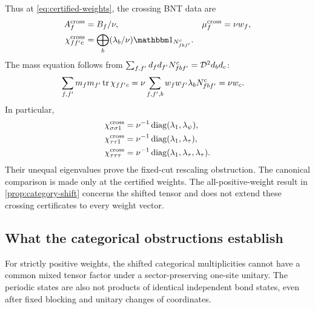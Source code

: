 Thus at \cref{eq:certified-weights}, the crossing BNT data are
\begin{align}
	A_f^{\mathrm{cross}}   & =B_f/\nu,                                    &
	\mu_f^{\mathrm{cross}} & =\nu w_f,                                      \\
	\chi_{ff'c}^{\mathrm{cross}}
	                       & =\bigoplus_b(\lambda_b/\nu)\Id_{N_{fbf'}^c}.
\end{align}
The mass equation follows from
$\sum_{f,f'}d_fd_{f'}N_{fbf'}^c=\mathcal{D}^2d_bd_c$:
\begin{align}
	\sum_{f,f'}m_fm_{f'}\operatorname{tr}\chi_{ff'c}
	 & =\nu\sum_{f,f',b}w_fw_{f'}\lambda_bN_{fbf'}^c
	=\nu w_c.
\end{align}
In particular,
\begin{align}
	\chi_{\sigma\sigma1}^{\mathrm{cross}}
	 & =\nu^{-1}\operatorname{diag}(\lambda_1,\lambda_\psi),              \\
	\chi_{\tau\tau1}^{\mathrm{cross}}
	 & =\nu^{-1}\operatorname{diag}(\lambda_1,\lambda_\tau),              \\
	\chi_{\tau\tau\tau}^{\mathrm{cross}}
	 & =\nu^{-1}\operatorname{diag}(\lambda_1,\lambda_\tau,\lambda_\tau).
\end{align}
Their unequal eigenvalues prove the fixed-cut rescaling obstruction.
The canonical comparison is made only at the certified weights.
The all-positive-weight result in \cref{prop:category-shift} concerns
the shifted tensor and does not extend these crossing certificates
to every weight vector.

\subsection{What the categorical obstructions establish}

\begin{proposition}
	\label{prop:restricted-obstruction}
	For strictly positive weights, the shifted categorical multiplicities
	cannot have a common mixed tensor factor under a sector-preserving
	one-site unitary. The periodic states are also not products of
	identical independent bond states, even after fixed blocking and
	unitary changes of coordinates.
\end{proposition}

